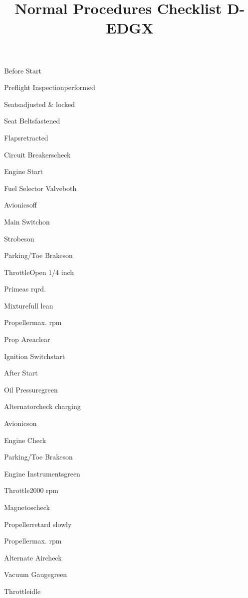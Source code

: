 \documentclass[12pt]{article}
\begin{document}
\title{Normal Procedures Checklist D-EDGX}

\begin{checklist}{Before Start}
  \item{Preflight Inspection}{performed}
  \item{Seats}{adjusted \& locked}
  \item{Seat Belts}{fastened}
  \item{Flaps}{retracted}
  \item{Circuit Breakers}{check}
\end{checklist}

\begin{checklist}{Engine Start}
  \item{Fuel Selector Valve}{both}
  \item{Avionics}{off}
  \item{Main Switch}{on}
  \item{Strobes}{on}
  \item{Parking/Toe Brakes}{on}
  \item{Throttle}{Open 1/4 inch}
  \item{Prime}{as rqrd.}
  \item{Mixture}{full lean}
  \item{Propeller}{max. rpm}
  \item{Prop Area}{clear}
  \item{Ignition Switch}{start}
\end{checklist}

\begin{checklist}{After Start}
  \item{Oil Pressure}{green}
  \item{Alternator}{check charging}
  \item{Avionics}{on}
\end{checklist}

\begin{checklist}{Engine Check}
  \item{Parking/Toe Brakes}{on}
  \item{Engine Instruments}{green}
  \item{Throttle}{2000 rpm}
  \item{Magnetos}{check}
  \item{Propeller}{retard slowly}
  \item{Propeller}{max. rpm}
  \item{Alternate Air}{check}
  \item{Vacuum Gauge}{green}
  \item{Throttle}{idle}
\end{checklist}
\end{document}
